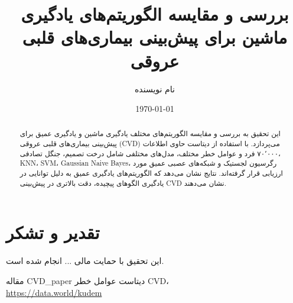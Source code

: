 \documentclass[12pt,a4paper]{book}
\title{بررسی و مقایسه الگوریتم‌های یادگیری ماشین برای پیش‌بینی بیماری‌های قلبی عروقی}
\author{نام نویسنده}
\date{\today}
\begin{document}
\frontmatter
\maketitle


\begin{abstract}
این تحقیق به بررسی و مقایسه الگوریتم‌های مختلف یادگیری ماشین و یادگیری عمیق برای پیش‌بینی بیماری‌های قلبی عروقی (CVD) می‌پردازد. با استفاده از دیتاست حاوی اطلاعات ۷۰٬۰۰۰ فرد و عوامل خطر مختلف، مدل‌های مختلفی شامل درخت تصمیم، جنگل تصادفی، KNN، SVM، Gaussian Naive Bayes، رگرسیون لجستیک و شبکه‌های عصبی عمیق مورد ارزیابی قرار گرفته‌اند. نتایج نشان می‌دهد که الگوریتم‌های یادگیری عمیق به دلیل توانایی در یادگیری الگوهای پیچیده، دقت بالاتری در پیش‌بینی CVD نشان می‌دهند.
\end{abstract}

\tableofcontents

\mainmatter

\backmatter
\section*{تقدیر و تشکر}
این تحقیق با حمایت مالی ... انجام شده است.



\begin{thebibliography}{9}
 مقاله CVD\_paper
 دیتاست عوامل خطر CVD، \\\url{https://data.world/kudem}
\end{thebibliography}
\end{document}

